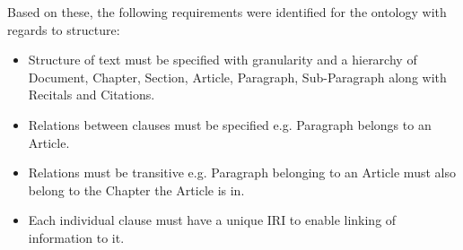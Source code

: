 Based on these, the following requirements were identified for the ontology with regards to structure:
\begin{itemize}
    \item Structure of text must be specified with granularity and a hierarchy of Document, Chapter, Section, Article, Paragraph, Sub-Paragraph along with Recitals and Citations.
    \item Relations between clauses must be specified e.g. Paragraph belongs to an Article.
    \item Relations must be transitive e.g. Paragraph belonging to an Article must also belong to the Chapter the Article is in.
    \item Each individual clause must have a unique IRI to enable linking of information to it.
\end{itemize}

